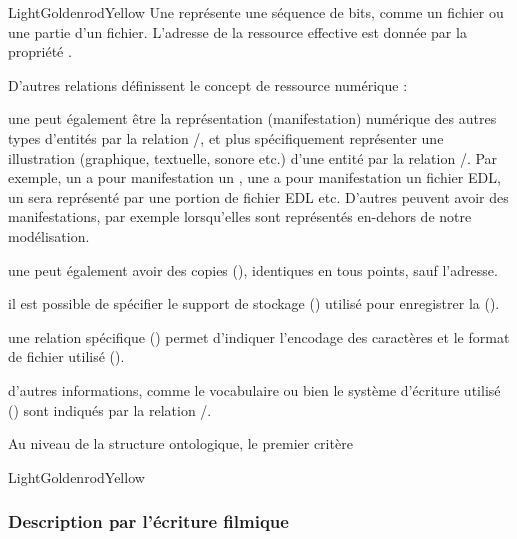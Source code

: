 \begin{cadrecol}{LightGoldenrodYellow}
Une  représente une séquence de bits, comme un fichier ou une partie d'un fichier. 
L'adresse de la ressource effective est donnée par la propriété . 
\end{cadrecol}
D'autres relations définissent le concept de ressource numérique :
\begin{liste}
	\item une  peut également être la représentation (manifestation) numérique des autres types d'entités par la relation /, et plus spécifiquement représenter une illustration (graphique, textuelle, sonore etc.) d'une entité par la relation /.
	Par exemple, un  a pour manifestation un , une  a pour manifestation un fichier EDL, un  sera représenté par une portion de fichier EDL etc.
	D'autres  peuvent avoir des manifestations, par exemple lorsqu'elles sont représentés en-dehors de notre modélisation.\\
	
	\item une  peut également avoir des copies (), identiques en tous points, sauf l'adresse. 
	\item il est possible de spécifier le support de stockage () utilisé pour enregistrer la  ().\\
	
	\item une relation spécifique () permet d'indiquer l'encodage des caractères et le format de fichier utilisé ().
	\item d'autres informations, comme le vocabulaire ou bien le système d'écriture utilisé () sont indiqués par la relation /.
\end{liste}

Au niveau de la structure ontologique, le premier critère 

\begin{cadrecol}{LightGoldenrodYellow}

\end{cadrecol}



\subsubsection{Description par l'écriture filmique}
